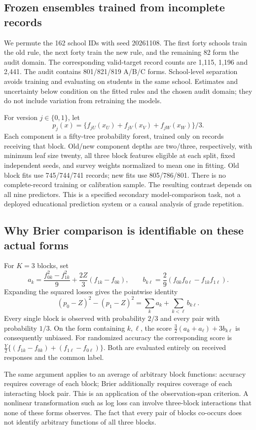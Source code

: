 \subsection{Frozen ensembles trained from incomplete records}
We permute the 162 school IDs with seed 20261108. The first forty schools
train the old rule, the next forty train the new rule, and the remaining
82 form the audit domain. The corresponding valid-target record counts
are 1,115, 1,196 and 2,441. The audit contains 801/821/819 A/B/C forms.
School-level separation avoids training and evaluating on students in
the same school. Estimates and uncertainty below condition on the fitted
rules and the chosen audit domain; they do not include variation from
retraining the models.

For version $j\in\{0,1\}$, let
\[
 p_j(x)=\{f_{jU}(x_U)+f_{jV}(x_V)+f_{jW}(x_W)\}/3.
\]
Each component is a fifty-tree probability forest, trained only on records
receiving that block. Old/new component depths are two/three, respectively,
with minimum leaf size twenty, all three block features eligible at each
split, fixed independent seeds, and survey weights normalized to mean
one in fitting. Old block fits use 745/744/741 records; new fits use
805/786/801. There is no complete-record training or calibration sample.
The resulting contrast depends on all nine predictors. This is a
specified secondary model-comparison task, not a deployed educational
prediction system or a causal analysis of grade repetition.

\subsection{Why Brier comparison is identifiable on these actual forms}
For $K=3$ blocks, set
\[
 a_k=\frac{f_{0k}^2-f_{1k}^2}{9}
       +\frac{2Z}{3}(f_{1k}-f_{0k}),\qquad
 b_{k\ell}=\frac{2}{9}(f_{0k}f_{0\ell}-f_{1k}f_{1\ell}).
\]
Expanding the squared losses gives the pointwise identity
\[
 (p_0-Z)^2-(p_1-Z)^2=\sum_k a_k+\sum_{k<\ell}b_{k\ell}.
\]
Every single block is observed with probability $2/3$ and every pair with
probability $1/3$. On the form containing $k,\ell$, the score
$\tfrac32(a_k+a_\ell)+3b_{k\ell}$ is consequently unbiased. For randomized
accuracy the corresponding score is
$\tfrac{Y}{2}\{(f_{1k}-f_{0k})+(f_{1\ell}-f_{0\ell})\}$.
Both are evaluated entirely on received responses and the common label.

The same argument applies to an average of arbitrary block functions:
accuracy requires coverage of each block; Brier additionally requires
coverage of each interacting block pair. This is an application of the
observation-span criterion. A nonlinear transformation such as log loss
can involve three-block interactions that none of these forms observes.
The fact that every pair of blocks co-occurs does not identify arbitrary
functions of all three blocks.

